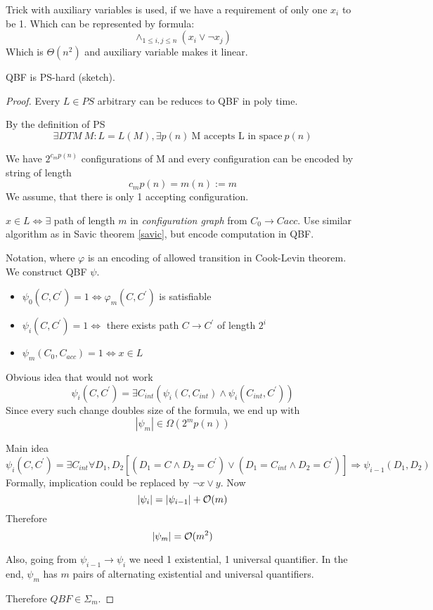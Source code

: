 \begin{note}
	Trick with auxiliary variables is used, if we have a requirement of only one $x_i$ to be 1.
	Which can be represented by formula:
	\[ \wedge_{1 \leq i,j \leq n}(x_i \lor \neg x_j) \]
	Which is $\Theta(n^2)$ and auxiliary variable makes it linear.
\end{note}

\begin{theorem}
	QBF is PS-hard (sketch).
\end{theorem}
\begin{proof}
	Every $L \in PS$ arbitrary can be reduces to QBF in poly time.

	By the definition of PS
	\[ \exists DTM\ M: L = L(M), \exists p(n)\ \text{M accepts L in space}\ p(n)\]

	We have $2^{c_m p(n)}$ configurations of M and every configuration can be encoded by string of length
	\[ c_m p(n) = m(n) := m \]
	We assume, that there is only 1 accepting configuration.

	$x \in L \iff \exists $ path of length $m$ in \emph{configuration graph} from $C_0 \to C{acc}$.
	Use similar algorithm as in Savic theorem \cref{savic}, but encode computation in QBF.

	Notation, where $\varphi$ is an encoding of allowed transition in Cook-Levin theorem.
	We construct QBF $\psi$.
	\begin{itemize}
		\item $ \psi_0(C, C^{\prime}) = 1 \iff \varphi_m(C, C^{\prime})$ is satisfiable
		\item $ \psi_i(C, C^{\prime}) = 1 \iff $ there exists path $C \to C^{\prime}$ of length $2^i$
		\item $ \psi_m(C_0, C_{acc}) = 1 \iff x \in L$
	\end{itemize}

	Obvious idea that would not work
	\[ \psi_i(C, C^{\prime}) = \exists C_{int} (\psi_i(C, C_{int}) \land \psi_i(C_{int}, C^{\prime})) \]
	Since every such change doubles size of the formula, we end up with
	\[ |\psi_m| \in \Omega(2^m p(n)) \]

	Main idea
	\[ \psi_i(C, C^{\prime}) = \exists C_{int} \forall D_1, D_2 [(D_1 = C \land D_2 = C^{\prime}) \lor (D_1 = C_{int} \land D_2 = C^{\prime})] \Rightarrow \psi_{i - 1}(D_1, D_2) \]
	Formally, implication could be replaced by $\neg x \lor y$.
	Now
	\[ |\psi_i| = |\psi_{i - 1}| + \mathcal{O}(m) \]
	Therefore
	\[ |\psi_m| = \mathcal{O}(m^2) \]

	Also, going from $\psi_{i - 1} \to \psi_{i}$ we need 1 existential, 1 universal quantifier.
	In the end, $\psi_m$ has $m$ pairs of alternating existential and universal quantifiers.

	Therefore $QBF \in \Sigma_m$.
\end{proof}

